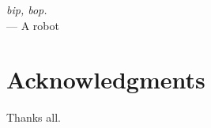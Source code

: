 
\begin{flushright}{\slshape bip, bop.} \\ \medskip
    --- A robot
\end{flushright}



\bigskip

\begingroup
\let\clearpage\relax
\let\cleardoublepage\relax
\let\cleardoublepage\relax
\chapter*{Acknowledgments}
Thanks all.
\endgroup
